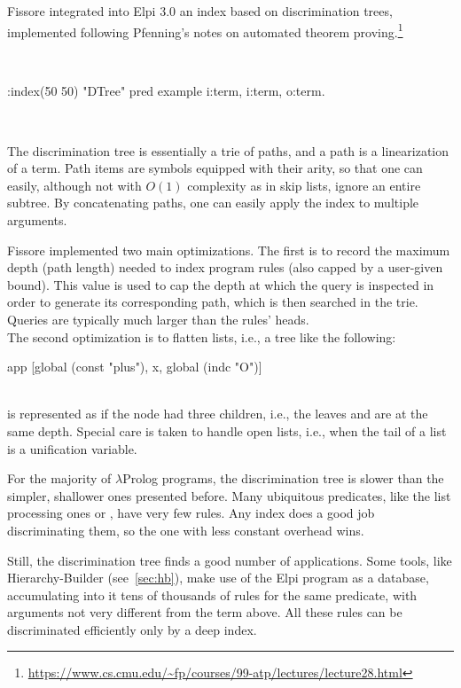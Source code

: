 \documentclass[a4paper, 11pt]{book}
\newenvironment{elpicode}
  {\VerbatimEnvironment~\\\begin{elpibox}\begin{xelpicode}}{\end{xelpicode}
\end{elpibox}\\}
\begin{document}
Fissore integrated into Elpi 3.0 an index based on discrimination trees,
implemented following Pfenning's notes on automated theorem
proving.\footnote{\url{https://www.cs.cmu.edu/~fp/courses/99-atp/lectures/lecture28.html}}

\begin{elpicode}
:index(50 50) "DTree" %
pred example i:term, i:term, o:term.
\end{elpicode}


The discrimination tree is essentially a trie of paths, and a path is a
linearization of a term. Path items are symbols equipped with their arity, so
that one can easily, although not with $O(1)$ complexity as in skip lists,
ignore an entire subtree. By concatenating paths, one can easily apply the
index to multiple arguments.


Fissore implemented two main optimizations. The first is to record the maximum
depth (path length) needed to index program rules (also capped by a user-given
bound). This value is used to cap the depth at which the query is inspected in
order to generate its corresponding path, which is then searched in the trie.
Queries are typically much larger than the rules' heads.\\
The second optimization is to flatten lists, i.e., a tree like the following:
\begin{elpicode}
app [global (const "plus"), x, global (indc "O")]
\end{elpicode}
\noindent
is represented as if the  node had three children, i.e., the leaves
 and  are at the same depth. Special care is taken to
handle open lists, i.e., when the tail of a list is a unification variable.


For the majority of $\lambda$Prolog programs, the discrimination tree is
slower than the simpler, shallower ones presented before. Many ubiquitous
predicates, like the list processing ones  or , have very
few rules. Any index does a good job discriminating them, so the one with less
constant overhead wins.


Still, the discrimination tree finds a good number of applications. Some tools,
like Hierarchy-Builder (see~\cref{sec:hb}), make use of the Elpi program as a
database, accumulating into it tens of thousands of rules for the same
predicate, with arguments not very different from the term above. All these
rules can be discriminated efficiently only by a deep index.
\end{document}
